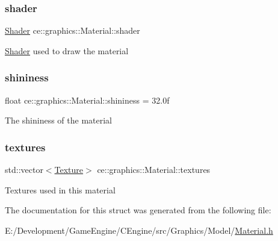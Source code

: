 \subsubsection{\texorpdfstring{shader}{shader}}
{\footnotesize\ttfamily \hyperlink{classce_1_1graphics_1_1_shader}{Shader} ce\+::graphics\+::\+Material\+::shader}

\hyperlink{classce_1_1graphics_1_1_shader}{Shader} used to draw the material \mbox{\label{structce_1_1graphics_1_1_material_a62ed7d4af263dbdd7065a9b664bfab6e}} 
\subsubsection{\texorpdfstring{shininess}{shininess}}
{\footnotesize\ttfamily float ce\+::graphics\+::\+Material\+::shininess = 32.\+0f}

The shininess of the material \mbox{\label{structce_1_1graphics_1_1_material_ad14fc2a8d3a7d9241226471f8f2e2fcc}} 
\subsubsection{\texorpdfstring{textures}{textures}}
{\footnotesize\ttfamily std\+::vector$<$\hyperlink{structce_1_1graphics_1_1_texture}{Texture}$>$ ce\+::graphics\+::\+Material\+::textures}

Textures used in this material 

The documentation for this struct was generated from the following file\+:\begin{DoxyCompactItemize}
\item 
E\+:/\+Development/\+Game\+Engine/\+C\+Engine/src/\+Graphics/\+Model/\hyperlink{_material_8h}{Material.\+h}\end{DoxyCompactItemize}
